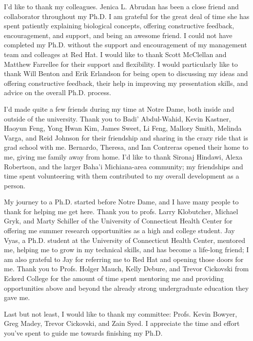 \begin{acknowledge}
  I'd like to thank my colleagues.  Jenica L. Abrudan has been a close friend and collaborator throughout my Ph.D.  I am grateful for the great deal of time she has spent patiently explaining biological concepts, offering constructive feedback, encouragement, and support, and being an awesome friend.  I could not have completed my Ph.D. without the support and encouragement of my management team and colleages at Red Hat.  I would like to thank Scott McClellan and Matthew Farrellee for their support and flexibility.  I would particularly like to thank Will Benton and Erik Erlandson for being open to discussing my ideas and offering constructive feedback, their help in improving my presentation skills, and advice on the overall Ph.D. process.

  I'd made quite a few friends during my time at Notre Dame, both inside and outside of the university.  Thank you to Badi' Abdul-Wahid, Kevin Kastner, Haoyun Feng, Yong Hwan Kim, James Sweet, Li Feng, Mallory Smith, Melinda Varga, and Reid Johnson for their friendship and sharing in the crazy ride that is grad school with me.  Bernardo, Theresa, and Ian Contreras opened their home to me, giving me family away from home. I'd like to thank Sironaj Hindawi, Alexa Robertson, and the larger Baha'i Michiana-area community; my friendships and time spent volunteering with them contributed to my overall development as a person.

  My journey to a Ph.D. started before Notre Dame, and I have many people to thank for helping me get here.  Thank you to profs. Larry Klobutcher, Michael Gryk, and Marty Schiller of the University of Connecticut Health Center for offering me summer research opportunities as a high and college student.  Jay Vyas, a Ph.D. student at the University of Connecticut Health Center, mentored me, helping me to grow in my technical skills, and has become a life-long friend; I am also grateful to Jay for referring me to Red Hat and opening those doors for me.  Thank you to Profs. Holger Mauch, Kelly Debure, and Trevor Cickovski from Eckerd College for the amount of time spent mentoring me and providing opportunities above and beyond the already strong undergraduate education they gave me.

  Last but not least, I would like to thank my committee: Profs. Kevin Bowyer, Greg Madey, Trevor Cickovski, and Zain Syed.  I appreciate the time and effort you've spent to guide me towards finishing my Ph.D.
  
\end{acknowledge}
